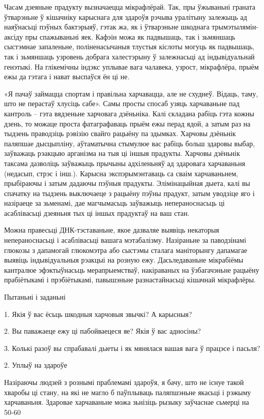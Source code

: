 Часам дзеяньне прадукту вызначаецца мікрафлёрай. Так, пры ўжываньні граната ўтварэньне ў кішачніку карыснага для здароўя рэчыва уралітыну залежыць ад наяўнасьці пэўных бактэрыяў, гэтак жа, як і ўтварэньне шкоднага трымэтылямін-аксіду пры спажываньні яек. Кафэін можа як падвышаць, так і зьмяншаць сыстэмнае запаленьне, поліненасычаныя тлустыя кіслоты могуць як падвышаць, так і зьмяншаць узровень добрага халестэрыну ў залежнасьці ад індывідуальнай генэтыкі. На глікемічны індэкс уплывае вага чалавека, узрост, мікрафлёра, прыём ежы да гэтага і нават выспаўся ён ці не.

«Я пачаў займацца спортам і правільна харчавацца, але не схуднеў. Відаць, таму, што не перастаў хлусіць сабе». Самы просты спосаб узяць харчаваньне пад кантроль – гэта вядзеньне харчовага дзёньніка. Калі складана рабіць гэта кожны дзень, то можаце проста фатаграфаваць прыём ежы перад ядой, а затым раз на тыдзень праводзіць рэвізію свайго рацыёну па здымках. Харчовы дзёньнік паляпшае дысцыпліну, аўтаматычна стымулюе вас рабіць больш здаровы выбар, заўважаць рэакцыю арганізма на тыя ці іншыя прадукты. Харчовы дзёньнік таксама дазволіць заўважыць прычыны адхіленьняў ад здаровага харчаваньня (недасып, стрэс і інш.). Карысна экспэрымэнтаваць са сваім харчаваньнем, прыбіраючы і затым дадаючы пэўныя прадукты. Элімінацыйная дыета, калі вы спачатку на тыдзень выключаеце з рацыёну пэўны прадукт, затым уводзіце яго і назіраеце за зьменамі, дае магчымасьць заўважыць непераноснасьць ці асаблівасьці дзеяньня тых ці іншых прадуктаў на ваш стан.

Можна правесьці ДНК-тэставаньне, якое дазваляе выявіць некаторыя непераноснасьці і асаблівасьці вашага мэтабалізму. Назіраньне за паводзінамі глюкозы з дапамогай глюкомэтра або сыстэмы сталага маніторынгу дапамагае выявіць індывідуальныя рэакцыі на розную ежу. Дасьледаваньне мікрабіёмы кантралюе эфэктыўнасьць мерапрыемстваў, накіраваных на ўзбагачэньне рацыёну прабіётыкамі і прэбіётыкамі, павышэньне разнастайнасьці кішачнай мікрафлёры.

Пытаньні і заданьні

1. Якія ў вас ёсьць шкодныя харчовыя звычкі? А карысныя?

2. Вы паважаеце ежу ці пабойваецеся яе? Якія ў вас адносіны?

3. Колькі разоў вы спрабавалі дыеты і як мянялася вашая вага ў працэсе і пасьля?


2. Уплыў на здароўе

Назіраючы людзей з рознымі праблемамі здароўя, я бачу, што не існуе такой хваробы ці стану, на які не магло б паўплываць паляпшэньне якасьці і рэжыму харчаваньня. Здаровае харчаваньне можа зьнізіць рызыку заўчаснае сьмерці на 50-60%


